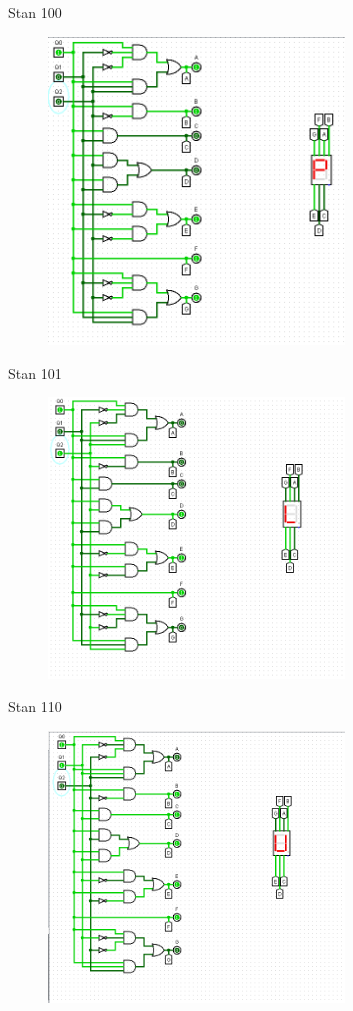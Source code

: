 \documentclass[]{article}
\begin{document}
\newpage
Stan 100
\begin{figure}[H]
	\centering
	\includegraphics[width=0.7\textwidth]{JEDEN_100.png}
\end{figure}
\newpage
Stan 101
\begin{figure}[H]
	\centering
	\includegraphics[width=0.7\textwidth]{JEDEN_101.png}
\end{figure}
\newpage
Stan 110
\begin{figure}[H]
	\centering
	\includegraphics[width=0.7\textwidth]{JEDEN_110.png}
\end{figure}
\end{document}
